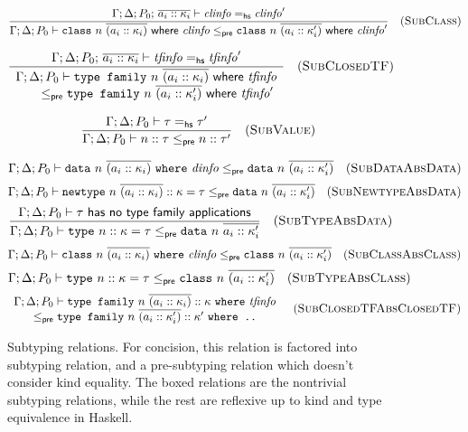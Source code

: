 \begin{figure}
\[
\frac{
\Gamma; \Delta; P_0;\, \overline{a_i :: \kappa_i} \vdash \mathit{clinfo} =_\textsf{hs} \mathit{clinfo}'
}{
\Gamma; \Delta; P_0 \vdash \texttt{class}~n~\overline{(a_i :: \kappa_i)} ~\textsf{where}~ \mathit{clinfo} \le_\textsf{pre} \texttt{class}~n~\overline{(a_i :: \kappa'_i)} ~\textsf{where}~ \mathit{clinfo}'
}
\quad(\textsc{SubClass})
\]

\[
\frac{
\Gamma; \Delta; P_0;\, \overline{a_i :: \kappa_i} \vdash \mathit{tfinfo} =_\textsf{hs} \mathit{tfinfo}'
}{
\begin{array}{l}
\Gamma; \Delta; P_0 \vdash \texttt{type family}~n~\overline{(a_i :: \kappa_i)} ~\textsf{where}~ \mathit{tfinfo}
\\ \qquad \le_\textsf{pre} \texttt{type family}~n~\overline{(a_i :: \kappa'_i)} ~\textsf{where}~ \mathit{tfinfo}'
\end{array}
}
\quad(\textsc{SubClosedTF})
\]

\[
\frac{
\Gamma; \Delta; P_0 \vdash \tau =_\textsf{hs} \tau'
}{
\Gamma; \Delta; P_0 \vdash n :: \tau \le_\textsf{pre} n :: \tau'
}
\quad(\textsc{SubValue})
\]


\begin{mdframed}
\[
\Gamma; \Delta; P_0 \vdash \texttt{data}~n~\overline{(a_i :: \kappa_i)} ~\texttt{where}~ \mathit{dinfo} \le_\textsf{pre} \texttt{data}~n~\overline{(a_i :: \kappa'_i)}
\quad(\textsc{SubDataAbsData})
\]
\[
\Gamma; \Delta; P_0 \vdash \texttt{newtype}~n~\overline{(a_i :: \kappa_i)} :: \kappa = \tau \le_\textsf{pre} \texttt{data}~n~\overline{(a_i :: \kappa'_i)}
\quad(\textsc{SubNewtypeAbsData})
\]
\[
\frac{
\Gamma; \Delta; P_0 \vdash \tau ~\textsf{has no type family applications}
}{
\Gamma; \Delta; P_0 \vdash \texttt{type}~n :: \kappa = \tau \le_\textsf{pre} \texttt{data}~n~\overline{a_i :: \kappa'_i}
}
\quad(\textsc{SubTypeAbsData})
\]
\[
\Gamma; \Delta; P_0 \vdash \texttt{class}~n~\overline{(a_i :: \kappa_i)}~\texttt{where}~ \mathit{clinfo} \le_\textsf{pre} \texttt{class}~n~\overline{(a_i :: \kappa'_i)}
\quad(\textsc{SubClassAbsClass})
\]
\[
\Gamma; \Delta; P_0 \vdash \texttt{type}~n :: \kappa = \tau \le_\textsf{pre} \texttt{class}~n~\overline{(a_i :: \kappa'_i)}
\quad(\textsc{SubTypeAbsClass})
\]
\[
\begin{array}{c}
\Gamma; \Delta; P_0 \vdash \texttt{type family}~n~\overline{(a_i :: \kappa_i)} :: \kappa ~\texttt{where}~ \mathit{tfinfo} \\
\le_\textsf{pre} \texttt{type family}~n~\overline{(a_i :: \kappa'_i)} :: \kappa' ~\texttt{where ..}
\end{array}
\quad(\textsc{SubClosedTFAbsClosedTF})
\]
\end{mdframed}
\caption{Subtyping relations.  For concision, this relation is factored into
subtyping relation, and a pre-subtyping relation which doesn't consider kind
equality.  The boxed relations are the nontrivial subtyping relations, while
the rest are reflexive up to kind and type equivalence in Haskell.}
\end{figure}
